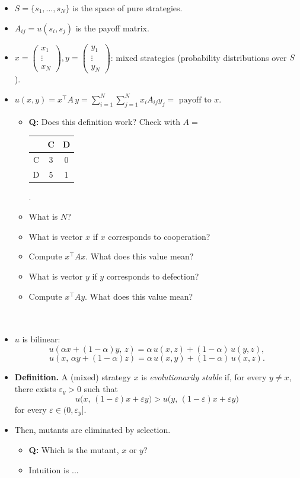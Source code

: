 \documentclass[20pt]{extarticle}
\newcommand{\pdmatrix}[4]{%
\begin{center}
\begin{tabular}{|c||c|c|}
\hline
 & C & D \\
\hline\hline
C & #1 & #2 \\
\hline
D & #3 & #4 \\
\hline
\end{tabular}
\end{center}
}
\begin{document}
\begin{itemize}
\item $S = \{ s_1, \ldots, s_N \}$ is the space of pure strategies.
\item $A_{ij}=u(s_i,s_j)$ is the payoff matrix.
\item $x = \begin{pmatrix} x_1\\ \vdots \\ x_N \end{pmatrix}, y = \begin{pmatrix} y_1\\ \vdots \\ y_N \end{pmatrix}$: mixed strategies (probability distributions over $S$).
\item $u(x,y) = x^{\top} A\, y = \sum_{i=1}^N \sum_{j=1}^N x_i A_{ij} y_j = \text{ payoff to } x$.
	\begin{itemize}
	\item \textbf{Q:} Does this definition work? Check with $A =$ \pdmatrix{3}{0}{5}{1}.
	\item What is $N$?
	\item What is vector $x$ if $x$ corresponds to cooperation?
	\item Compute $x^{\top} A x$. What does this value mean?
	\item What is vector $y$ if $y$ corresponds to defection?
	\item Compute $x^{\top} A y$. What does this value mean?
	\ \\
	\ \\
	\ \\
	\end{itemize}
\item $u$ is bilinear:
\[ u(\alpha x + (1-\alpha)y,\, z) = \alpha\, u(x,z) + (1-\alpha)\, u(y,z), \]
\[ u(x,\, \alpha y + (1-\alpha) z) = \alpha\, u(x,y) + (1-\alpha)\, u(x,z). \]
\end{itemize}

\begin{itemize}
\item \textbf{Definition.} A (mixed) strategy $x$ is \emph{evolutionarily stable} if, for every $y \neq x$, there exists $\varepsilon_y > 0$ such that
\[ u\bigl(x,\, (1-\varepsilon)x + \varepsilon y\bigr) > u\bigl(y,\, (1-\varepsilon)x + \varepsilon y\bigr) \]
for every $\varepsilon \in (0, \varepsilon_y]$.
%
\item Then, mutants are eliminated by selection.
	\begin{itemize}
	\item \textbf{Q:} Which is the mutant, $x$ or $y$?
	\item Intuition is ...
	\ \\
	\ \\
	\ \\
	\ \\
	\end{itemize}
%
\end{itemize}
\end{document}
